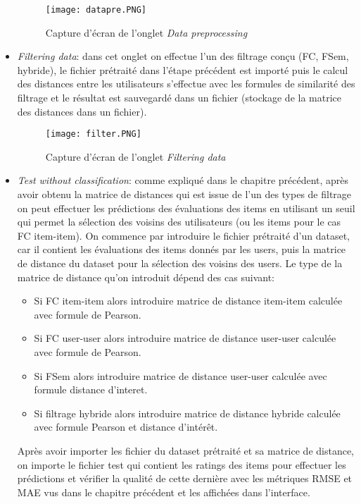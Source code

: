 \begin{itemize}
\begin{figure}[H]
	\centering
	\texttt{[image: datapre.PNG]}
	\caption{Capture d'écran de l'onglet \textit{Data preprocessing}}
	\label{fig:datapre}
\end{figure}

	\item \textit{Filtering data}: dans cet onglet on effectue l'un des filtrage conçu (FC, FSem, hybride), le fichier prétraité dans l'étape précédent est importé puis le calcul des distances entre les utilisateurs s'effectue avec les formules de similarité des filtrage et le résultat est sauvegardé dans un fichier (stockage de la matrice des distances dans un fichier).
	
	\begin{figure}[H]
		\centering
		\texttt{[image: filter.PNG]}
		\caption{Capture d'écran de l'onglet \textit{Filtering data}}
		\label{fig:filter}
	\end{figure}
	\item \textit{Test without classification}: comme expliqué dans le chapitre précédent, après avoir obtenu la matrice de distances qui est issue de l'un des types de filtrage on peut effectuer les prédictions des évaluations des items en utilisant un seuil qui permet la sélection des voisins des utilisateurs (ou les items pour le cas FC item-item).
	On commence par introduire le fichier prétraité d'un dataset, car il contient les évaluations des items donnés par les users, puis la matrice de distance du dataset pour la sélection des voisins des users. Le type de la matrice de distance qu'on introduit dépend des cas suivant:
	\begin{itemize}
		\item Si FC item-item alors introduire matrice de distance item-item calculée avec formule de Pearson.
		\item Si FC user-user alors introduire matrice de distance user-user calculée avec formule de Pearson.
		\item Si FSem alors introduire matrice de distance user-user calculée avec formule distance d'interet.
		\item Si filtrage hybride alors introduire matrice de distance hybride calculée avec formule Pearson et distance d'intérêt.
	\end{itemize}
	
	Après avoir importer les fichier du dataset prétraité et sa matrice de distance, on importe le fichier test qui contient les ratings des items pour effectuer les prédictions et vérifier la qualité de cette dernière avec les métriques RMSE et MAE vus dans le chapitre précédent et les affichées dans l'interface.
	

\end{itemize}
